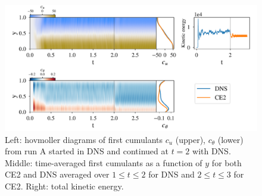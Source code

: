 \documentclass{jfm}
\newcommand{\cu}{c_u}
\begin{document}
\begin{figure}
  \centering
  \includegraphics[width=\textwidth]{../../figs/run_A_fig.pdf}
  \caption{Left: hovmoller diagrams of first cumulants $\cu$ (upper), $c_\theta$ (lower) from run A started in DNS and continued at $t=2$ with DNS. Middle: time-averaged first cumulants as a function of $y$ for both CE2 and DNS averaged over $1 \le t \le 2$ for DNS and $2 \le t \le 3$ for CE2. Right: total kinetic energy.}
  \label{fig:run_A}
\end{figure}
\end{document}
